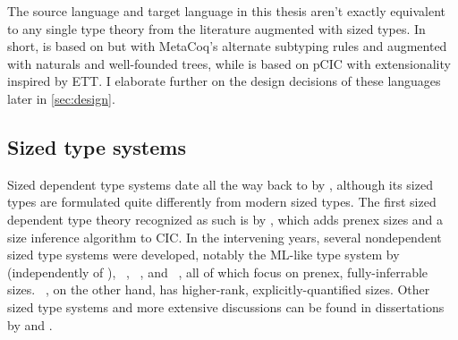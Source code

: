 The source language \lang and target language \CICE in this thesis aren't exactly
equivalent to any single type theory from the literature augmented with sized types.
In short, \lang is based on \GCC but with MetaCoq's alternate subtyping rules
and augmented with naturals and well-founded trees,
while \CICE is based on pCIC with extensionality inspired by ETT.
I elaborate further on the design decisions of these languages later in \cref{sec:design}.

\subsection{Sized type systems}

Sized dependent type systems date all the way back to \CCR by \citet{CCR},
although its sized types are formulated quite differently from modern sized types.
The first sized dependent type theory recognized as such is \CIChat by \citet{CIC-hat},
which adds prenex sizes
and a size inference algorithm to CIC.
In the intervening years, several nondependent sized type systems were developed,
notably the ML-like type system by \citet{hughes} (independently of \CCR),
\lambdahat~\citep{lambda-hat, lambda-hat-diss},
\Fhat~\citep{F-hat}, and
\Fhattimes~\citep{F-hat-times},
all of which focus on prenex, fully-inferrable sizes.
\Fhatomega~\citep{Abel-diss}, on the other hand,
has higher-rank, explicitly-quantified sizes.
Other sized type systems and more extensive discussions can be found in dissertations by
\citet{lambda-hat-diss} and \citet{Abel-diss}.

